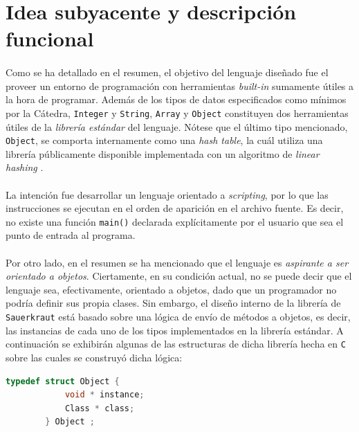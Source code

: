 \documentclass[12pt]{article}
\begin{document}
	\newpage


	\section{Idea subyacente y descripción funcional}
	
	\paragraph{} Como se ha detallado en el resumen, el objetivo del lenguaje diseñado fue el proveer un entorno de programación con herramientas \textit{built-in} sumamente útiles a la hora de programar. Además de los tipos de datos especificados como mínimos por la Cátedra, \verb|Integer| y \verb|String|, \verb|Array| y \verb|Object| constituyen dos herramientas útiles de la \textit{librería estándar} del lenguaje. Nótese que el último tipo mencionado, \verb|Object|, se comporta internamente como una \textit{hash table}, la cuál utiliza una librería públicamente disponible implementada con un algoritmo de \textit{linear hashing} \cite{linear_hash}.  
	
	\paragraph{} La intención fue desarrollar un lenguaje orientado a \textit{scripting}, por lo que las instrucciones se ejecutan en el orden de aparición en el archivo fuente. Es decir, no existe una función \verb|main()| declarada explícitamente por el usuario que sea el punto de entrada al programa. 
	
	\paragraph{} Por otro lado, en el resumen se ha mencionado que el lenguaje es \textit{aspirante a ser orientado a objetos}. Ciertamente, en su condición actual, no se puede decir que el lenguaje sea, efectivamente, orientado a objetos, dado que un programador no podría definir sus propia clases. Sin embargo, el diseño interno de la librería de \verb|Sauerkraut| está basado sobre una lógica de envío de métodos a objetos, es decir, las instancias de cada uno de los tipos implementados en la librería estándar. A continuación se exhibirán algunas de las estructuras de dicha librería hecha en \verb|C| sobre las cuales se construyó dicha lógica:

	\begin{center}
		\begin{lstlisting}[language=C]
		typedef struct Object {
			void * instance;
			Class * class;
		} Object ;
		\end{lstlisting}
	\end{center}
	
\end{document}
